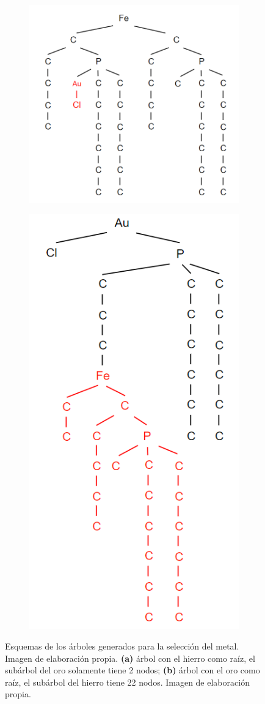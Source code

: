 \begin{figure}[h!]
\centering
\begin{subfigure}{.5\textwidth}
  \centering
  \includegraphics[width=.95\linewidth]{imagenes/diseno/canonizado/mol23Modified_Fe_raiz_resalte.png}
  \caption{}
  \label{fig:sub1}
\end{subfigure}%
\begin{subfigure}{.5\textwidth}
  \centering
  \includegraphics[width=.45\linewidth]{imagenes/diseno/canonizado/mol23Modified_Au_raiz_resalte.png}
  \caption{}
  \label{fig:sub2}
\end{subfigure}
\caption{Esquemas de los árboles generados para la selección del metal. Imagen de elaboración propia. \textbf{(a)} árbol con el hierro como raíz, el subárbol del oro solamente tiene 2 nodos; \textbf{(b)} árbol con el oro como raíz, el subárbol del hierro tiene 22 nodos. Imagen de elaboración propia.}
\label{fig:desempate_metales1}
\end{figure}



